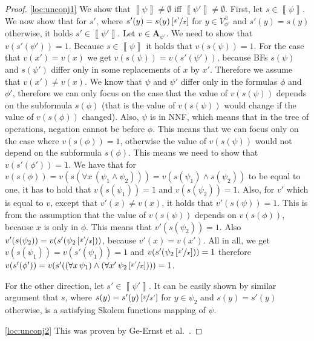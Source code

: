\documentclass[
  digital, %
  color,
  twoside, %
  table,   %
  nolof,     %
  nolot,     %
]{fithesis3}
\theoremstyle{definition}
\theoremstyle{remark}
\newcommand{\seman}[1]{\left\llbracket {#1} \right\rrbracket}
\newcommand{\substitute}[2]{\left[ \nicefrac{#2}{#1} \right]}
\newcommand{\valtns}[1]{\mathbf{A}_{#1}}
\newcommand{\evars}[1]{V_{#1}^{\exists}}
\newcommand{\itholds}{\,}
\begin{document}
\begin{proof}
  \eqref{loc:unconj1} We show that $\seman{\psi} \not= \emptyset$ iff $\seman{\psi'} \not= \emptyset$. First, let $s \in \seman{\psi}$. We now show that for $s'$, where $s'(y) = s(y)\substitute{x}{x'}$ for $y \in \evars{\phi'}$ and $s'(y) = s(y)$ otherwise, it holds $s' \in \seman{\psi'}$. Let $v \in \valtns{\psi'}$. We need to show that $v(s'(\psi')) = 1$. Because $s \in \seman{\psi}$ it holds that $v(s(\psi)) = 1$. For the case that $v(x') = v(x)$ we get $v(s(\psi)) = v(s'(\psi'))$, because BFs $s(\psi)$ and $s(\psi')$ differ only in some replacements of $x$ by $x'$. Therefore we assume that $v(x') \not= v(x)$. We know that $\psi$ and $\psi'$ differ only in the formulas $\phi$ and $\phi'$, therefore we can only focus on the case that the value of $v(s(\psi))$ depends on the subformula $s(\phi)$ (that is the value of $v(s(\psi))$ would change if the value of $v(s(\phi))$ changed). Also, $\psi$ is in NNF, which means that in the tree of operations, negation cannot be before $\phi$. This means that we can focus only on the case where $v(s(\phi)) = 1$, otherwise the value of $v(s(\psi))$ would not depend on the subformula $s(\phi)$. This means we need to show that $v(s'(\phi')) = 1$. We have that for $v(s(\phi)) = v(s(\forall x \itholds (\psi_1 \land \psi_2))) = v(s(\psi_1) \land s(\psi_2))$ to be equal to one, it has to hold that $v(s(\psi_1)) = 1$ and $v(s(\psi_2)) = 1$. Also, for $v'$ which is equal to $v$, except that $v'(x) \not= v(x)$, it holds that $v'(s(\psi)) = 1$. This is from the assumption that the value of $v(s(\psi))$ depends on $v(s(\phi))$, because $x$ is only in $\phi$. This means that $v'(s(\psi_2)) = 1$. Also $v'(s(\psi_2)) = v(s'(\psi_2\substitute{x}{x'}))$, because $v'(x) = v(x')$. All in all, we get $v(s(\psi_1)) = v(s'(\psi_1)) = 1$ and $v(s'(\psi_2\substitute{x}{x'})) = 1$ therefore $v(s'(\phi')) = v(s'((\forall x \itholds \psi_1) \land (\forall x' \itholds \psi_2\substitute{x}{x'}))) = 1$.
  
  For the other direction, let $s' \in \seman{\psi'}$. It can be easily shown by similar argument that $s$, where $s(y) = s'(y)\substitute{x'}{x}$ for $y \in \psi_2$ and $s(y) = s'(y)$ otherwise, is a satisfying Skolem functions mapping of $\psi$.
  
  \eqref{loc:unconj2} This was proven by Ge-Ernst et al.~\cite[Theorem 4]{HQSquantifierLocalisation}.
  
  

\end{proof}
\end{document}
